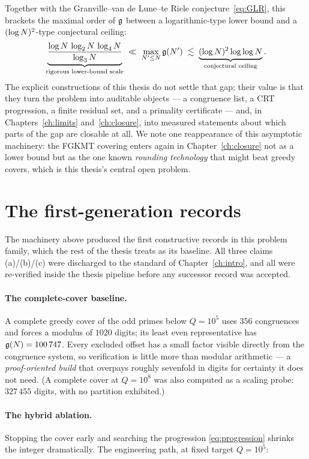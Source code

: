 Together with the Granville--van de Lune--te Riele
conjecture~\eqref{eq:GLR}, this brackets the maximal order of $\mathfrak{g}$
between a logarithmic-type lower bound and a $(\log N)^2$-type
conjectural ceiling:
\[
\underbrace{\frac{\log N\,\log_2 N\,\log_4 N}{\log_3 N}}_{\text{rigorous lower-bound scale}}
\;\ll\;\max_{N'\le N}\mathfrak{g}(N')
\;\lesssim\;
\underbrace{(\log N)^2\log\log N}_{\text{conjectural ceiling}}.
\]
The explicit constructions of this thesis do not settle that gap; their
value is that they turn the problem into auditable objects --- a
congruence list, a CRT progression, a finite residual set, and a
primality certificate --- and, in Chapters~\ref{ch:limits}
and~\ref{ch:closure}, into measured statements about which parts of the
gap are closable at all. We note one reappearance of this asymptotic
machinery: the FGKMT covering enters again in
Chapter~\ref{ch:closure} not as a lower bound but as the one known
\emph{rounding technology} that might beat greedy covers, which is this
thesis's central open problem.

\section{The first-generation records}\label{sec:firstgen}

The machinery above produced the first constructive records in this
problem family, which the rest of the thesis treats as its baseline.
All three claims (a)/(b)/(c) were discharged to the standard of
Chapter~\ref{ch:intro}, and all were re-verified inside the thesis
pipeline before any successor record was accepted.

\paragraph{The complete-cover baseline.} A complete greedy cover of the
odd primes below $Q=10^5$ uses $356$ congruences and forces a modulus of
$1020$ digits; its least even representative has $\mathfrak{g}(N)=100\,747$.
Every excluded offset has a small factor visible directly from the
congruence system, so verification is little more than modular
arithmetic --- a \emph{proof-oriented build} that overpays roughly
sevenfold in digits for certainty it does not need. (A complete cover at
$Q=10^8$ was also computed as a scaling probe: $327\,455$ digits, with
no partition exhibited.)

\paragraph{The hybrid ablation.} Stopping the cover early and searching
the progression \eqref{eq:progression} shrinks the integer dramatically.
The engineering path, at fixed target $Q=10^5$:


